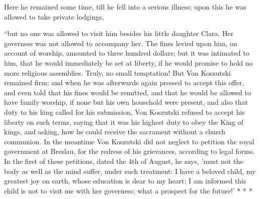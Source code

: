 Here he remained some time, till he fell into a
serious illness; upon this he was allowed to take private lodgings,

``but no one was allowed to visit him
besides his little daughter Clara. Her governess was not allowed to
accompany her. The fines levied upon him, on account of worship,
amounted to three hundred dollars; but it was intimated to him, that he
would immediately be set at liberty, if he would promise to hold no more
religious assemblies. Truly, no small temptation! But Von Koszutski
remained firm; and when he was afterwards again pressed to accept this
offer, and even told that his fines would be remitted, and that he would
be allowed to have family worship, if none but his own household were
present, and also that duty to his king called for his submission, Von
Koszutski refused to accept his liberty on such terms, saying that it
was his highest duty to obey the King of kings, and asking, how he could
receive the sacrament without a church communion. In the meantime Von
Koszutski did not neglect to petition the royal government at Breslau,
for the redress of his grievances, according to legal forms. In the
first of these petitions, dated the 4th of August, he says, 'must not
the body as well as the mind suffer, under such treatment: I have a
beloved child, my greatest joy on earth, whose education is dear to my
heart; I am informed this child is not to visit me with her governess;
what a prospect for the future!' *
* *


